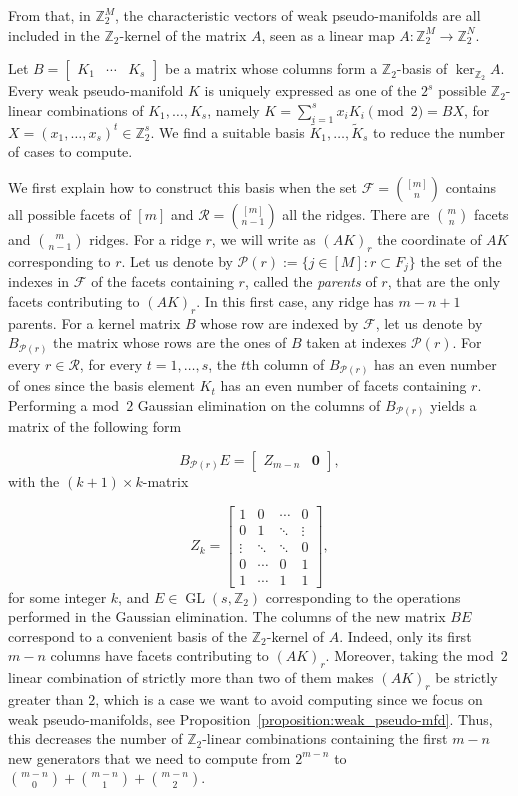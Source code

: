 \documentclass[11pt]{amsart}
\theoremstyle{plain}
\numberwithin{equation}{section}
\theoremstyle{definition}
\newcommand{\cP}{\mathcal{P}}
\newcommand{\cF}{\mathcal{F}}
\newcommand{\cR}{\mathcal{R}}
\newcommand{\Z}{\mathbb{Z}}
\DeclareMathOperator{\GL}{GL}
\begin{document}
From that, in $\Z_2^M$, the characteristic vectors of weak pseudo-manifolds are all included in the $\Z_2$-kernel of the matrix $A$, seen as a linear map $A\colon \Z_2^M \to \Z_2^N$.

Let $B=\begin{bmatrix} K_1 &\cdots & K_s\end{bmatrix}$ be a matrix whose columns form a $\Z_2$-basis of $\ker_{\Z_2} A$.
Every weak pseudo-manifold $K$ is uniquely expressed as one of the $2^s$ possible $\Z_2$-linear combinations of $K_1,\ldots,K_s$, namely $K=\sum_{i=1}^s x_i K_i \pmod{2}= BX$, for $X=(x_1,\ldots,x_s)^t\in\Z_2^s$.
We find a suitable basis $\widetilde{K}_1,\ldots,\widetilde{K}_s$ to reduce the number of cases to compute.

We first explain how to construct this basis when the set $\cF=\binom{[m]}{n}$ contains all possible facets of $[m]$ and $\cR=\binom{[m]}{n-1}$ all the ridges.
There are $\binom{m}{n}$ facets and $\binom{m}{n-1}$ ridges.
For a ridge $r$, we will write as $(AK)_r$ the coordinate of $AK$ corresponding to $r$.
Let us denote by $\cP(r):=\{j\in[M] \colon r\subset F_j\}$ the set of the indexes in $\cF$ of the facets containing $r$, called the \emph{parents} of $r$, that are the only facets contributing to $(AK)_r$.
In this first case, any ridge has $m-n+1$ parents.
For a kernel matrix $B$ whose row are indexed by $\cF$, let us denote by $B_{\cP(r)}$ the matrix whose rows are the ones of $B$ taken at indexes $\cP(r)$.
For every $r\in\cR$, for every $t=1,\ldots,s$, the $t$th column of $B_{\cP(r)}$ has an even number of ones since the basis element $K_t$ has an even number of facets containing $r$.
Performing a mod~$2$ Gaussian elimination on the columns of $B_{\cP(r)}$ yields a matrix of the following form

$$B_{\cP(r)} E=\begin{bmatrix}Z_{m-n}&\mathbf{0}\end{bmatrix},$$
with the $(k+1)\times k$-matrix

$$ Z_k = \begin{bmatrix}
	1&0&\cdots&0\\
	0& 1 & \ddots &\vdots\\
	\vdots&\ddots&\ddots&0\\
	0&\cdots&0&1\\
	1&\cdots&1&1
\end{bmatrix},$$
for some integer $k$, and $E\in \GL(s,\Z_2)$ corresponding to the operations performed in the Gaussian elimination.
The columns of the new matrix $B E$ correspond to a convenient basis of the $\Z_2$-kernel of $A$.
Indeed, only its first $m-n$ columns have facets contributing to $(AK)_r$.
Moreover, taking the mod~$2$ linear combination of strictly more than two of them makes $(AK)_r$ be strictly greater than $2$, which is a case we want to avoid computing since we focus on weak pseudo-manifolds, see Proposition~\ref{proposition:weak_pseudo-mfd}.
Thus, this decreases the number of $\Z_2$-linear combinations containing the first $m-n$ new generators that we need to compute from $2^{m-n}$ to $\binom{m-n}{0}+\binom{m-n}{1}+\binom{m-n}{2}$.
\end{document}
